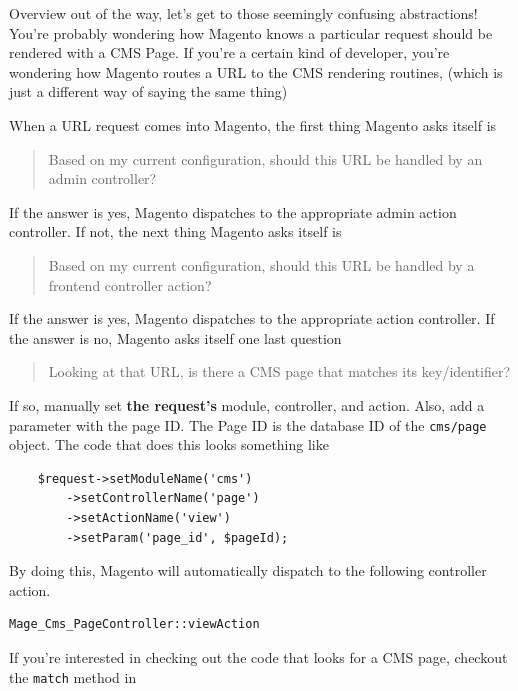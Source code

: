 \documentclass[oneside]{book}
\begin{document}
Overview out of the way, let's get to those seemingly confusing abstractions!  You're probably wondering how Magento knows a particular request should be rendered with a CMS Page.  If you're a certain kind of developer, you're wondering how Magento routes a URL to the CMS rendering routines, (which is just a different way of saying the same thing)

When a URL request comes into Magento, the first thing Magento asks itself is

\begin{quote}
Based on my current configuration, should this URL be handled by an admin controller?
\end{quote}

If the answer is yes, Magento dispatches to the appropriate admin action controller. If not, the next thing Magento asks itself is

\begin{quote}
Based on my current configuration, should this URL be handled by a frontend controller action?
\end{quote}

If the answer is yes, Magento dispatches to the appropriate action controller.   If the answer is no, Magento asks itself one last question

\begin{quote}
Looking at that URL, is there a CMS page that matches its key/identifier?
\end{quote}

If so, manually set \textbf{the request's} module, controller, and action.  Also, add a parameter with the page ID.  The Page ID is the database ID of the \footnotesize\texttt{cms/page} \normalsize  object.  The code that does this looks something like

\begin{lstlisting}
    $request->setModuleName('cms')
        ->setControllerName('page')
        ->setActionName('view')
        ->setParam('page_id', $pageId);

\end{lstlisting}


By doing this, Magento will automatically dispatch to the following controller action.

\begin{lstlisting}
Mage_Cms_PageController::viewAction

\end{lstlisting}


If you're interested in checking out the code that looks for a CMS page, checkout the \footnotesize\texttt{match} \normalsize  method in 
\end{document}
